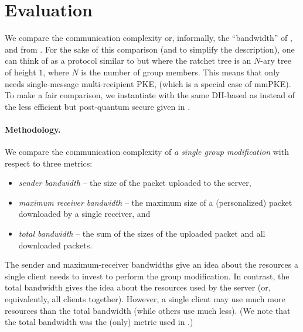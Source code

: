 
\section{Evaluation}\label{sec:eval}
We compare the communication complexity or, informally, the ``bandwidth'' of \saik, \protITK and \protCMPKE from \cite{hashimoto2021cmpke}. For the sake of this comparison (and to simplify the description), one
can think of \protCMPKE as a protocol similar to \saik but where the ratchet tree is an $N$-ary tree of height $1$, where $N$ is the number of group members.
This means that \protCMPKE only needs single-message multi-recipient PKE, \mPKE (which is a special case of mmPKE).
To make a fair comparison, we instantiate \protCMPKE with the same DH-based \mPKE as \saik
instead of the less efficient but post-quantum secure \mPKE
given in \cite{hashimoto2021cmpke}.


\paragraph{Methodology.}
We compare the communication complexity of \emph{a single group modification} with respect to three metrics:
\begin{itemize}
	\item  \emph{sender bandwidth} -- the size of the packet uploaded to the
server,
\item  \emph{maximum receiver bandwidth} -- the maximum size of a (personalized) packet downloaded by a single
receiver, and
\item   \emph{total bandwidth} --  the sum of the sizes of the uploaded packet and all downloaded packets.
\end{itemize}
The sender and maximum-receiver bandwidths give an idea about the resources a single client needs to invest to perform the group modification. In contrast, the total bandwidth gives the idea about the resources used by the server (or, equivalently, all clients together). However, a single client may use much more resources than the total bandwidth (while others use much less). (We note that the total bandwidth was the (only) metric used in \cite{hashimoto2021cmpke}.)

